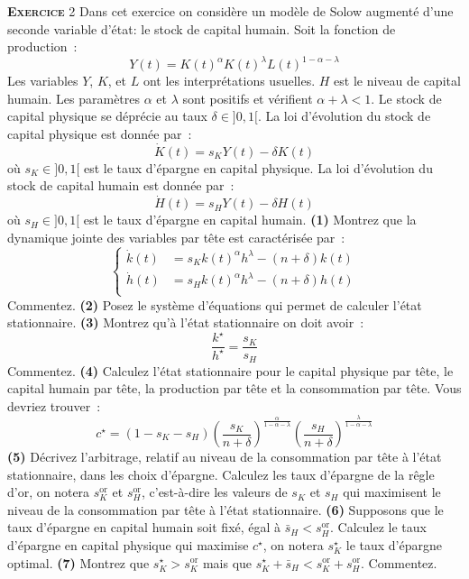 \documentclass[10pt,a4paper,notitlepage,twocolumn]{article}
\newcommand{\exercice}[1]{\textsc{\textbf{Exercice}} #1}
\newcommand{\question}[1]{\textbf{(#1)}}
\begin{document}
\exercice{2} Dans cet exercice on considère un modèle de Solow
augmenté d'une seconde variable d'état: le stock de capital humain.
Soit la fonction de production :
\[
Y(t) = K(t)^{\alpha}K(t)^{\lambda}L(t)^{1-\alpha-\lambda}
\]
Les variables $Y$,  $K$, et $L$ ont  les interprétations usuelles.
$H$ est le niveau de capital humain.  Les paramètres $\alpha$ et
$\lambda$ sont  positifs et  vérifient $\alpha+\lambda<1$.  Le  stock de
capital physique se  déprécie au taux $\delta\in]0,1[$.   La loi d'évolution
du stock de capital physique est donnée par :
\[
\dot{K}(t) = s_{K} Y(t) - \delta K(t)
\]
où $s_{K}\in]0,1[$ est le taux d'épargne en capital physique. La loi
d'évolution du stock de capital humain est donnée par :
\[
\dot{H}(t) = s_{H} Y(t) - \delta H(t)
\]
où $s_{H}\in]0,1[$ est le taux d'épargne en capital
humain. \question{1} Montrez que la dynamique jointe des variables par
tête est caractérisée par :
\[
  \begin{cases}
    \dot{k}(t) &= s_{K}k(t)^{\alpha}h^{\lambda} - (n+\delta)k(t)\\
    \dot{h}(t) &= s_{H}k(t)^{\alpha}h^{\lambda} - (n+\delta)h(t)\\
  \end{cases}
\]
Commentez. \question{2} Posez le système d'équations qui permet de
calculer l'état stationnaire. \question{3} Montrez qu'à l'état
stationnaire on doit avoir :
\[
\frac{k^{\star}}{h^{\star}} = \frac{s_{K}}{s_{H}}
\]
Commentez. \question{4} Calculez l'état stationnaire pour le capital
physique par tête, le capital humain par tête, la production par tête
et la consommation par tête. Vous devriez trouver :
\[
c^{\star} = (1-s_{K}-s_{H})\left(\frac{s_{K}}{n+\delta}\right)^{\frac{\alpha}{1-\alpha-\lambda}}\left(\frac{s_{H}}{n+\delta}\right)^{\frac{\lambda}{1-\alpha-\lambda}}
\]
\question{5} Décrivez l'arbitrage, relatif au niveau de la
consommation par tête à l'état stationnaire, dans les choix
d'épargne. Calculez les taux d'épargne de la rêgle d'or, on notera
$s_{K}^{\mathrm{or}}$ et $s_{H}^{\mathrm{or}}$, c'est-à-dire les
valeurs de $s_{K}$ et $s_{H}$ qui maximisent le niveau de la
consommation par tête à l'état stationnaire. \question{6} Supposons
que le taux d'épargne en capital humain soit fixé, égal à
$\bar{s}_{H}<s_{H}^{\mathrm{or}}$. Calculez le taux d'épargne en
capital physique qui maximise $c^{\star}$, on notera $s_{K}^{\star}$
le taux d'épargne optimal. \question{7} Montrez que
$s_{K}^{\star}>s_{K}^{\mathrm{or}}$ mais que
$s_{K}^{\star}+\bar{s}_{H}<s_{K}^{\mathrm{or}}+s_{H}^{\mathrm{or}}$. Commentez.
\end{document}
